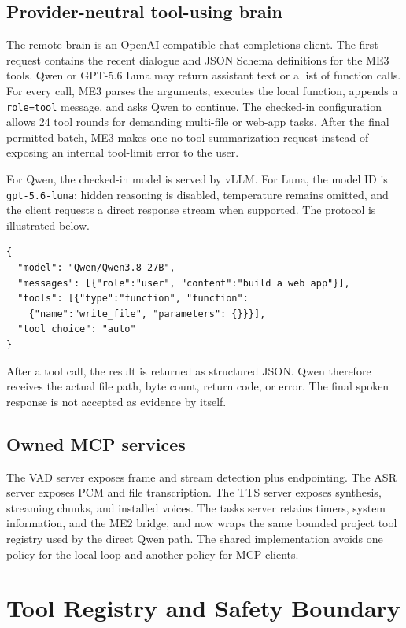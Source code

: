 \documentclass[sigconf,nonacm]{acmart}
\begin{document}
\subsection{Provider-neutral tool-using brain}

The remote brain is an OpenAI-compatible chat-completions client. The first
request contains the recent dialogue and JSON Schema definitions for the ME3
tools. Qwen or GPT-5.6 Luna may return assistant text or a list of function
calls. For every
call, ME3 parses the arguments, executes the local function, appends a
\texttt{role=tool} message, and asks Qwen to continue. The checked-in
configuration allows 24 tool rounds for demanding multi-file or web-app tasks.
After the final permitted batch, ME3 makes one no-tool summarization request
instead of exposing an internal tool-limit error to the user.

For Qwen, the checked-in model is served by vLLM. For Luna, the model ID is
\texttt{gpt-5.6-luna}; hidden reasoning is disabled, temperature remains
omitted, and the client requests a direct response stream when supported. The
protocol is illustrated below.

\begin{lstlisting}
{
  "model": "Qwen/Qwen3.8-27B",
  "messages": [{"role":"user", "content":"build a web app"}],
  "tools": [{"type":"function", "function":
    {"name":"write_file", "parameters": {}}}],
  "tool_choice": "auto"
}
\end{lstlisting}

After a tool call, the result is returned as structured JSON. Qwen therefore
receives the actual file path, byte count, return code, or error. The final
spoken response is not accepted as evidence by itself.

\subsection{Owned MCP services}

The VAD server exposes frame and stream detection plus endpointing. The ASR
server exposes PCM and file transcription. The TTS server exposes synthesis,
streaming chunks, and installed voices. The tasks server retains timers,
system information, and the ME2 bridge, and now wraps the same bounded project
tool registry used by the direct Qwen path. The shared implementation avoids
one policy for the local loop and another policy for MCP clients.

\section{Tool Registry and Safety Boundary}
\end{document}
